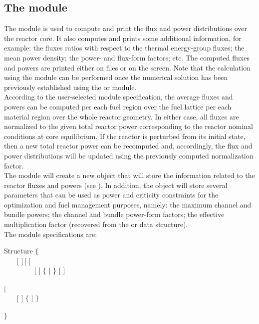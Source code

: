 \subsection{The  module}\label{sect:flpow}

\vskip 0.2cm
The  module is used to compute and print the flux and power
distributions over the reactor core. It also computes and prints some additional
information, for example: the fluxes ratios with respect to the thermal energy-group
fluxes; the mean power density; the power- and flux-form factors; etc. The computed
fluxes and powers are printed either on files or on the screen. Note that the calculation
using the  module can be performed once the numerical solution has
been previously established using the  or  module.\\

According to the user-selected module specification, the average fluxes and
powers can be computed per each fuel region over the fuel lattice 
per each material region over the whole reactor geometry. In either case, all fluxes
are normalized to the given total reactor power corresponding to the reactor nominal
conditions at core equilibrium. If the reactor is perturbed from its initial state, then a
new total reactor power can be recomputed and, accordingly, the flux and power
distributions will be updated using the previously computed normalization factor.\\

The  module will create a new  object that will store
the information related to the reactor fluxes and powers (see ). In addition,
the  object will store several parameters that can be used as power
and criticity constraints for the optimization and fuel management purposes, namely:
the maximum channel and bundle powers; the channel and bundle power-form factors;
the effective multiplication factor (recovered from the  or  data structure).\\

\noindent
The  module specifications are:

\begin{DataStructure}{Structure }
$\{$ \\
~~~ $[$  $]~[$  $]$ \\
~~~~~~~~\moc{:=}   $[$  $]$ 
$\{$  $|$  $\}$   $[$  $]$ \\
~~~~~~~~\moc{::}  \\
$|$ \\
~~~ \moc{:=}   $[$  $]$
$\{$  $|$  $\}$   \\
~~~~~~~~\moc{::}  \\
 $\}$
 \end{DataStructure}

